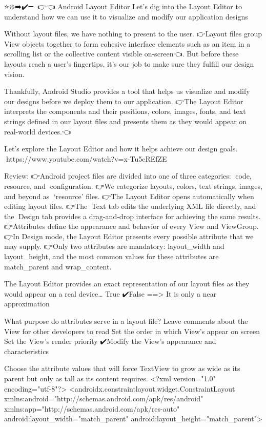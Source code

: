 ⭐❇️➡️✔️➖🔗💎👉👈
Android Layout Editor
        Let's dig into the Layout Editor to understand how we can use it to visualize and modify our application designs

        Without layout files, we have nothing to present to the user. 👉Layout files group View objects together to form cohesive interface elements such as an item in a scrolling list or the collective content visible on-screen👈. But before these layouts reach a user’s fingertips, it’s our job to make sure they fulfill our design vision.

        Thankfully, Android Studio provides a tool that helps us visualize and modify our designs before we deploy them to our application. 👉The Layout Editor interprets the components and their positions, colors, images, fonts, and text strings defined in our layout files and presents them as they would appear on real-world devices.👈

        Let’s explore the Layout Editor and how it helps achieve our design goals.
            🔗https://www.youtube.com/watch?v=x-Tu5cREfZE

        Review:
            👉Android project files are divided into one of three categories: 💎code, 💎resource, and 💎configuration.
            👉We categorize layouts, colors, text strings, images, and beyond as 💎‘resource’ files.
            👉The Layout Editor opens automatically when editing layout files.
            👉The 💎Text tab edits the underlying XML file directly, and the 💎Design tab provides a drag-and-drop interface for achieving the same results.
            👉Attributes define the appearance and behavior of every View and ViewGroup.
            👉In Design mode, the Layout Editor presents every possible attribute that we may supply.
            👉Only two attributes are mandatory: layout_width and layout_height, and the most common values for these attributes are match_parent and wrap_content.
        
        The Layout Editor provides an exact representation of our layout files as they would appear on a real device…
            True
            ✔️False ==> It is only a near approximation

        What purpose do attributes serve in a layout file?
            Leave comments about the View for other developers to read
            Set the order in which View’s appear on screen
            Set the View’s render priority
            ✔️Modify the View’s appearance and characteristics

        Choose the attribute values that will force TextView to grow as wide as its parent but only as tall as its content requires.
            <?xml version="1.0" encoding="utf-8"?>
            <androidx.constraintlayout.widget.ConstraintLayout xmlns:android="http://schemas.android.com/apk/res/android"
                xmlns:app="http://schemas.android.com/apk/res-auto"
                android:layout_width="match_parent"
                android:layout_height="match_parent">
            
